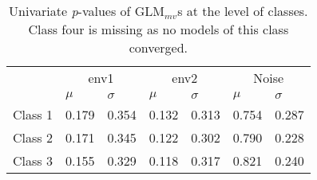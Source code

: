 		\begin{table*}[h!]
			
			\small
			\caption{Univariate \textit{p}-values of GLM$_{mv}$s at the level of classes. Class four is missing as no models of this class converged.}
			\centering
			
			\begin{tabular}{@{}lllllll@{}}
				
				\toprule
				& \multicolumn{2}{c}{env1} & \multicolumn{2}{c}{env2} & \multicolumn{2}{c}{Noise}\\ \cmidrule(l){2-3} \cmidrule(l){4-5} \cmidrule(l){6-7}
				& $\mu$ & $\sigma$ & $\mu$ & $\sigma$ & $\mu$ & $\sigma$\\
				\hline
				Class 1 & 0.179 & 0.354 & 0.132 & 0.313 & 0.754 & 0.287 \\
				Class 2 & 0.171 & 0.345 & 0.122 & 0.302 & 0.790 & 0.228 \\
				Class 3 & 0.155 & 0.329 & 0.118 & 0.317 & 0.821 & 0.240	 \\
				\toprule
				
			\end{tabular}
			
			\label{tab:GLMUNI1}
			
		\end{table*}
		
